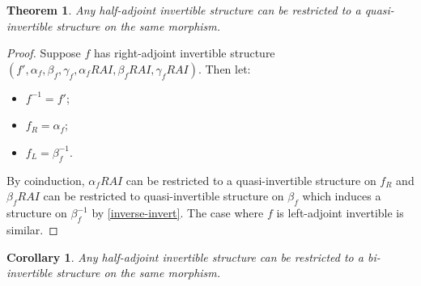 \documentclass{article}
\newtheorem{theorem}{Theorem}
\newtheorem{cor}{Corollary}
\theoremstyle{definition}
\theoremstyle{remark}
\newcommand{\inv}[1]{#1^{-1}}
\begin{document}
\begin{theorem}
  Any half-adjoint invertible structure can be restricted to a quasi-invertible structure on the same morphism.
\end{theorem}
\begin{proof}
  Suppose \(f\) has right-adjoint invertible structure \((f', \alpha_f, \beta_f, \gamma_f, \alpha_f{}RAI, \beta_f{}RAI, \gamma_f{}RAI)\). Then let:
  \begin{itemize}
  \item \(\inv f = {f'}\);
  \item \(f_R = \alpha_f\);
  \item \(f_L = \beta_f^{-1}\).
  \end{itemize}
  By coinduction, \(\alpha_f{}RAI\) can be restricted to a quasi-invertible structure on \(f_R\) and \(\beta_f{}RAI\) can be restricted to quasi-invertible structure on \(\beta_f\) which induces a structure on \(\inv {\beta_f}\) by \cref{inverse-invert}. The case where \(f\) is left-adjoint invertible is similar.
\end{proof}

\begin{cor}
  Any half-adjoint invertible structure can be restricted to a bi-invertible structure on the same morphism.
\end{cor}
\end{document}

